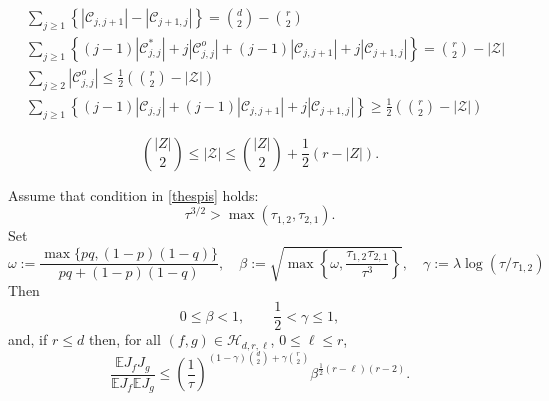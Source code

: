 \documentclass[10pt,a4paper]{amsart}
\def\CC{\mathscr{C}}
\def\E{\mathbb{E}}
\def\HH{\mathscr{H}}
\def\ZZ{\mathscr Z}
\begin{document}
\begin{corollary}
\begin{align}
&\sum_{j \ge 1} \left\{ |\CC_{j,j+1}| - |\CC_{j+1,j}|\right\} 
= \binom{d}{2}-\binom{r}{2}
\label{por1}
\\
&\sum_{j \ge 1} \left\{(j-1)|\CC_{j,j}^*| + j |\CC_{j,j}^o| 
+ (j-1)|\CC_{j,j+1}| + j |\CC_{j+1,j}| \right\} 
= \binom{r}{2} - |\ZZ|
\label{por2}
\\
&\sum_{j \ge 2} |\CC_{j, j}^o| \le \frac{1}{2} \left( \binom{r}{2} - |\ZZ| \right)
\label{por3}
\\
&
\sum_{j \ge 1} \left\{
(j-1) |\CC_{j, j}| + (j-1)|\CC_{j, j+1}| + j |\CC_{j+1, j}| \right\}
\ge \frac{1}{2} \left( \binom{r}{2} - |\ZZ| \right)
\label{por4}
\end{align}
\end{corollary}

\begin{lemma} 
\label{lambduplem}
\begin{equation}
\label{lambdupeq}
\binom{|Z|}{2}  \le |\ZZ| \le \binom{|Z|}{2} + \frac{1}{2} (r - |Z|).
\end{equation}
\end{lemma}

\begin{lemma}
\label{shuplem}
Assume that condition in \eqref{thespis} holds:
\[
\tau^{3/2} > \max(\tau_{1,2}, \tau_{2,1}).
\]
Set
\begin{equation}
\omega := \frac{\max\{pq, (1-p)(1-q)\}}{pq + (1-p)(1-q)}, 
\quad
\beta := \sqrt{\max\left\{\omega, \frac{\tau_{1, 2}\tau_{2, 1}}{\tau^3}\right\}},
\quad
\gamma := \lambda \log (\tau/\tau_{1,2})
\label{gammadef}
\end{equation} 
Then
\[
0 \le \beta < 1, \qquad \frac{1}{2} < \gamma \le 1,
\]
and, if $r \le d$ then,
for all $(f,g) \in \HH_{d,r,\ell}$, $0 \le \ell \le r$,
\begin{equation} 
\label{shupeq}
\frac{\E J_f J_g}{\E J_f \E J_g}
\le  \left( \frac{1}{\tau} \right)^{(1-\gamma)\binom{d}{2} + \gamma\binom{r}{2}}
\beta^{\frac{1}{2}(r - \ell)(r-2)}.
\end{equation}
\end{lemma}
\end{document}
